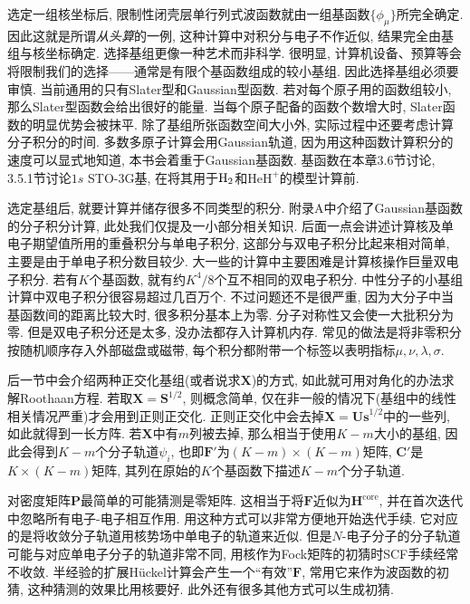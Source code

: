 选定一组核坐标后, 
限制性闭壳层单行列式波函数就由一组基函数$\{\phi_\mu\}$所完全确定. 
因此这就是所谓\emph{从头算}的一例, 
这种计算中对积分与电子\ha 不作近似, 
结果完全由基组与核坐标确定. 
选择基组更像一种艺术而非科学. 
很明显, 
计算机设备、预算等会将限制我们的选择——通常是有限个基函数组成的较小基组. 
因此选择基组必须要审慎. 
当前通用的只有Slater型和Gaussian型函数. 
若对每个原子用的函数组较小, 
那么Slater型函数会给出很好的能量. 
当每个原子配备的函数个数增大时, 
Slater函数的明显优势会被抹平. 
除了基组所张函数空间大小外, 
实际过程中还要考虑计算分子积分的时间. 
多数多原子计算会用Gaussian轨道, 
因为用这种函数计算积分的速度可以显式地知道, 
本书会着重于Gaussian基函数. 
基函数在本章3.6节讨论, 
3.5.1节讨论$1s$ STO-3G基, 
在将其用于$\mathrm{H}_2$和$\mathrm{HeH}^+$的模型计算前.


选定基组后, 
就要计算并储存很多不同类型的积分. 
附录A中介绍了Gaussian基函数的分子积分计算, 
此处我们仅提及一小部分相关知识. 
后面一点会讲述计算核\ha 及单电子期望值所用的重叠积分与单电子积分, 
这部分与双电子积分比起来相对简单, 
主要是由于单电子积分数目较少. 
大一些的计算中主要困难是计算核操作巨量双电子积分. 
若有$K$个基函数, 
就有约$K^4/8$个互不相同的双电子积分. 
中性分子的小基组计算中双电子积分很容易超过几百万个. 
不过问题还不是很严重, 
因为大分子中当基函数间的距离比较大时, 
很多积分基本上为零. 
分子对称性又会使一大批积分为零. 
但是双电子积分还是太多, 
没办法都存入计算机内存. 
常见的做法是将非零积分按随机顺序存入外部磁盘或磁带, 
每个积分都附带一个标签以表明指标$\mu,\nu,\lambda,\sigma$.


后一节中会介绍两种正交化基组(或者说求$\mathbf{X}$)的方式, 
如此就可用对角化的办法求解Roothaan方程. 
若取$\mathbf{X=S}^{1/2}$, 
则概念简单, 
仅在非一般的情况下(基组中的线性相关情况严重)才会用到正则正交化. 
正则正交化中会去掉$\mathbf{X=Us}^{1/2}$中的一些列, 
如此就得到一长方阵. 
若$\mathbf{X}$中有$m$列被去掉, 
那么相当于使用$K-m$大小的基组, 
因此会得到$K-m$个分子轨道$\psi_i$, 
也即$\mathbf{F'}$为$(K-m)\times(K-m)$矩阵, 
$\mathbf{C'}$是$K\times(K-m)$矩阵, 
其列在原始的$K$个基函数下描述$K-m$个分子轨道.


对密度矩阵$\mathbf{P}$最简单的可能猜测是零矩阵. 
这相当于将$\mathbf{F}$近似为$\mathbf{H}^\mathrm{core}$, 
并在首次迭代中忽略所有电子-电子相互作用. 
用这种方式可以非常方便地开始迭代手续. 
它对应的是将收敛分子轨道用核势场中单电子的轨道来近似. 
但是$N$-电子分子的分子轨道可能与对应单电子分子的轨道非常不同, 
用核\ha 作为Fock矩阵的初猜时SCF手续经常不收敛. 
半经验的扩展H\"uckel计算会产生一个``有效''$\mathbf{F}$, 
常用它来作为波函数的初猜, 
这种猜测的效果比用核\ha 要好. 
此外还有很多其他方式可以生成初猜.


